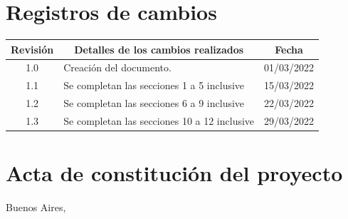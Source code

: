 \documentclass[
11pt, %
codirector, %
]{charter}
\begin{document}
\maketitle
\thispagestyle{empty}
\pagebreak


\thispagestyle{empty}
{\setlength{\parskip}{0pt}
\tableofcontents{}
}
\pagebreak


\section*{Registros de cambios}
\label{sec:registro}


\begin{table}[ht]
\label{tab:registro}
\centering
\begin{tabularx}{\linewidth}{@{}|c|X|c|@{}}
\hline
\rowcolor[HTML]{C0C0C0} 
Revisión & \multicolumn{1}{c|}{\cellcolor[HTML]{C0C0C0}Detalles de los cambios realizados} & Fecha      \\ \hline
1.0	& Creación del documento.				& 01/03/2022 \\ \hline
1.1	& Se completan las secciones 1 a 5 inclusive		& 15/03/2022 \\ \hline
1.2	& Se completan las secciones 6 a 9 inclusive                & 22/03/2022 \\ \hline
1.3     & Se completan las secciones 10 a 12 inclusive		& 29/03/2022 \\ \hline
\end{tabularx}
\end{table}

\pagebreak



\section*{Acta de constitución del proyecto}
\label{sec:acta}

\begin{flushright}
Buenos Aires, \fechaInicioName
\end{flushright}
\end{document}
